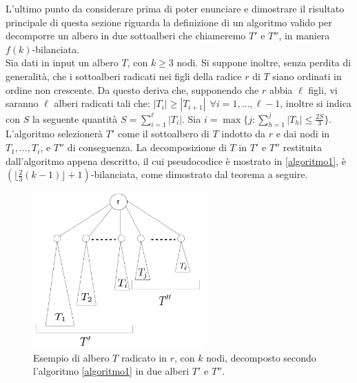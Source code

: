 L'ultimo punto da considerare prima di poter enunciare e dimostrare il risultato principale di questa sezione riguarda la definizione di un algoritmo valido per decomporre un albero in due sottoalberi che chiameremo $ T' $ e $ T'' $, in maniera $ f(k) $-bilanciata.\\
Sia dati in input un albero $ T $, con $ k\ge 3 $ nodi.
Si suppone inoltre, senza perdita di generalit\`a, che i sottoalberi radicati nei figli della radice $ r $ di $ T $ siano ordinati in ordine non crescente.
Da questo deriva che, supponendo che $ r $ abbia $ \ell $ figli, vi saranno $ \ell $ alberi radicati tali che: $ |T_{i}|\ge |T_{i+1}| \ \  \forall {i = 1,\dots, \ell-1} $, inoltre si indica con $ S $ la seguente quantit\`a $ S=\sum_{i=1}^{\ell}|T_i| $.
Sia $i = \max \{ j : \sum_{h=1}^{j} |T_h| \le \frac{2 S}{3} \}$. L'algoritmo selezionerà $T'$ come il sottoalbero di $T$ indotto da $r$ e dai nodi in $T_1, \dots, T_i$, e $T''$ di conseguenza.
La decomposizione di $T$ in $T'$ e $T''$ restituita dall'algoritmo appena descritto, il cui pseudocodice è mostrato in \ref{algoritmo1}, è $ (\lfloor \frac{2}{3}(k-1) \rfloor + 1)$-bilanciata, come dimostrato dal teorema a seguire.

	\begin{figure}[htbp]
	\centering
	\includegraphics[width=6.5cm]{capitolo3/grafo4}
	\caption{Esempio di albero $ T $ radicato in $ r $, con $ k $ nodi, decomposto secondo l'algoritmo \ref{algoritmo1} in due alberi $ T' $ e $ T'' $.}
	\label{fig:3} 
\end{figure}

